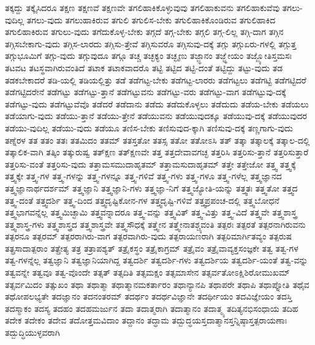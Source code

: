 {ತಕ್ಕದ್ದು
ತಕ್ಕೈಸಿದರೂ
ತಕ್ಷಣ
ತಕ್ಷಣವೆ
ತಕ್ಷಣವೇ
ತಗಲಿಹಾಕಿಕೊಳ್ಳುವುವು
ತಗಲಿಹಾಕುವನು
ತಗಲಿಹಾಕುವೆವು
ತಗಲು-ವುದಿಲ್ಲ
ತಗಲು-ವುದು
ತಗಲುಹಾಕಿರುವ
ತಗುಲಿ
ತಗುಲಿಸ-ಬೇಕು
ತಗುಲಿಹಾಕಿಕೊಂಡಿರುವ
ತಗುಲಿಹಾಕಿದ
ತಗುಲಿಹಾಕಿರುವ
ತಗುಲು-ವುದು
ತಗೆದುಕೊಳ್ಳ-ಬೇಕು
ತಗ್ಗದೆ
ತಗ್ಗ-ಬೇಕು
ತಗ್ಗಲಿ
ತಗ್ಗ-ಲಿಲ್ಲ
ತಗ್ಗಿ-ದಾಗ
ತಗ್ಗಿನ
ತಗ್ಗಿಸಬೇಕಾಗು-ವುದು
ತಗ್ಗಿಸ-ಲಾರದು
ತಗ್ಗಿಸು-ತ್ತೇವೆ
ತಗ್ಗಿಸುವರೊ
ತಗ್ಗಿಸುವು-ದಕ್ಕೆ
ತಗ್ಗು
ತಗ್ಗುಏರು-ಗಳಲ್ಲಿ
ತಗ್ಗುತ್ತ
ತಗ್ಗುಭೂಮಿಗೆ
ತಗ್ಗು-ವುದು
ತಗ್ಗುವುದೂ
ತಗ್ಗೂ
ತಚ್ಚ
ತಚ್ಛಕ್ಯಂ
ತಚ್ಛೃಣು
ತಜ್ಜ್ಞಾನಂ
ತಜ್ಜ್ಞೇಯಂ
ತಜ್ಜ್ಯೋತಿಸ್ತಮಸಃ
ತಟವಟ
ತಟಸ್ಥವಾಗಿರುವಂತಿದೆ
ತಟಾಕ
ತಟಾಕವಾದರೊ
ತಟ್ಟಿ
ತಟ್ಟಿದ
ತಟ್ಟಿ-ದಂತೆ
ತಟ್ಟಿದ್ದು
ತಟ್ಟು-ವುದು
ತಡ
ತಡಕಬೇಕಾದರೆ
ತಡಿ-ಯಲ್ಲಿ
ತಡಿಯಲ್ಲಿತ್ತು
ತಡೆ
ತಡೆಗಟ್ಟ-ಬೇಕು
ತಡೆಗಟ್ಟ-ಲಾರರು
ತಡೆಗಟ್ಟಲು
ತಡೆಗಟ್ಟಿ
ತಡೆಗಟ್ಟಿದರೆ
ತಡೆಗಟ್ಟಿದರೇನೆ
ತಡೆಗಟ್ಟು
ತಡೆಗಟ್ಟು-ತ್ತಾನೆ
ತಡೆಗಟ್ಟುವನು
ತಡೆಗಟ್ಟು-ವರು
ತಡೆಗಟ್ಟು-ವಾಗ
ತಡೆಗಟ್ಟುವು-ದಕ್ಕೆ
ತಡೆಗಟ್ಟು-ವುದು
ತಡೆಗಟ್ಟುವೆವೊ
ತಡೆದರೆ
ತಡೆದಾನು
ತಡೆದು
ತಡೆದುಕೊಳ್ಳಲು
ತಡೆದುದು
ತಡೆಯ-ಬೇಕು
ತಡೆಯಲು
ತಡೆಯಾಗು-ವುದು
ತಡೆಯು-ತ್ತಾನೆ
ತಡೆಯು-ತ್ತೇನೆ
ತಡೆಯುವನು
ತಡೆಯುವುದಕ್ಕೂ
ತಡೆಯುವು-ದಕ್ಕೆ
ತಡೆಯುವುದರ
ತಡೆಯು-ವುದಿಲ್ಲ
ತಡೆಯು-ವುದು
ತಡೆಯೂ
ತಣಿಸ-ಬೇಕು
ತಣಿಸುವುದ-ಕ್ಕಾಗಿ
ತಣಿಸುವು-ದಕ್ಕೆ
ತಣ್ಣಗಾಗು-ವುದು
ತಣ್ನೆರಳ
ತತ
ತತಂ
ತತಃ
ತತಮಿದಂ
ತತಮ್
ತತಸ್ತತೋ
ತತಸ್ಸ
ತತೋ
ತತೋಽಸಿ
ತತ್
ತತ್ಕಾ
ತತ್ಕಾಲಕ್ಕೆ
ತತ್ಕಾಲ-ದಲ್ಲಿ
ತತ್ಕಾಲಿಕ-ವಾಗಿ
ತತ್ಕಿಂ
ತತ್ಕುರುಷ್ವ
ತತ್ಕ್ಷಣ
ತತ್ಕ್ಷಣವೇ
ತತ್ತ
ತತ್ತದೇವಾವಗಚ್ಛ
ತತ್ತರಿಸಿ
ತತ್ತರಿಸು-ತ್ತಾನೆ
ತತ್ತರಿಸುತ್ತಾರೆ
ತತ್ತರಿಸು-ವಂತೆ
ತತ್ತರಿಸು-ವುದು
ತತ್ತಾಮಸಮುದಾಹೃತಮ್
ತತ್ತಾಮಸುದಾಹೃತಮ್
ತತ್ತೇ
ತತ್ತೇಜೋ
ತತ್ತ್ವ
ತತ್ತ್ವಕ್ಕೆ
ತತ್ತ್ವಕ್ಕೇ
ತತ್ತ್ವ-ಗಳ
ತತ್ತ್ವ-ಗಳನ್ನು
ತತ್ತ್ವ-ಗಳನ್ನೂ
ತತ್ತ್ವ-ಗಳಿವೆ
ತತ್ತ್ವ-ಗಳು
ತತ್ತ್ವ-ಗಳೂ
ತತ್ತ್ವ-ಗಳೆಲ್ಲ
ತತ್ತ್ವಜ್ಞಾನದ
ತತ್ತ್ವಜ್ಞಾನಾರ್ಥದರ್ಶಮ್
ತತ್ತ್ವಜ್ಞಾನಿ
ತತ್ತ್ವಜ್ಞಾನಿ-ಗಳು
ತತ್ತ್ವಜ್ಞಾ-ನಿಗೆ
ತತ್ತ್ವಜ್ಯೋತಿ-ಯನ್ನು
ತತ್ತ್ವತಃ
ತತ್ತ್ವತೋ
ತತ್ತ್ವದ
ತತ್ತ್ವ-ದಂತೆ
ತತ್ತ್ವದರ್ಶಿ
ತತ್ತ್ವ-ದಿಂದ
ತತ್ತ್ವದೃಷ್ಟಿಕೋನ-ಗಳ
ತತ್ತ್ವದೃಷ್ಟಿ-ಗಳಿವೆ
ತತ್ತ್ವಪ್ರಪಂಚ-ದಲ್ಲಿ
ತತ್ತ್ವಬೋಧನೆ
ತತ್ತ್ವಭಾಗವನ್ನೆಲ್ಲ
ತತ್ತ್ವಮಿಚ್ಛಾಮಿ
ತತ್ತ್ವವನ್ನಾದರೂ
ತತ್ತ್ವ-ವನ್ನು
ತತ್ತ್ವವಿತ್
ತತ್ತ್ವ-ವಿತ್ತು
ತತ್ತ್ವ-ವಿದೆ
ತತ್ತ್ವವೇ
ತತ್ತ್ವಶಾಸ್ತ್ರ
ತತ್ತ್ವಶಾಸ್ತ್ರ-ಗಳು
ತತ್ತ್ವಶಾಸ್ತ್ರದ
ತತ್ತ್ವಶಾಸ್ತ್ರವೇ
ತತ್ತ್ವಸೌಧಕ್ಕೆ
ತತ್ತ್ವೇನ
ತತ್ತ್ವೇನಾತಶ್ಚ್ಯವಂತಿ
ತತ್ಪರಃ
ತತ್ಪರತೆ
ತತ್ಪರನಾಗಿರುವನು
ತತ್ಪರನೂ
ತತ್ಪರಮ್
ತತ್ಪರರಾಗಿರು-ವಾಗ
ತತ್ಪರವಾಗಿರು-ವುದು
ತತ್ಪರಾಯಣರಾಗಿ
ತತ್ಪರಿಮಾರ್ಗಿತವ್ಯಂ
ತತ್ಪರುಷ
ತತ್ಪ್ರಸಾದಾತ್ಪರಾಂ
ತತ್ಪ್ರೇತ್ಯ
ತತ್ರ
ತತ್ರಾಪಶ್ಯತ್
ತತ್ರೈಕಸ್ಥಂ
ತತ್ರೈಕಾಗ್ರಮ್
ತತ್ರೈವಂ
ತತ್ರೈವಾವ್ಯಕ್ತಸಂಜ್ಞಕೇ
ತತ್ವ
ತತ್ವ-ಗಳ
ತತ್ವ-ಗಳನ್ನೆಲ್ಲ
ತತ್ವಜ್ಞಾನಿ
ತತ್ವಜ್ಞಾನಿಯಾಗಿದ್ದ
ತತ್ವದರ್ಶಿ
ತತ್ವದರ್ಶಿ-ಗಳು
ತತ್ವದರ್ಶಿಯ
ತತ್ವದರ್ಶಿ-ಯಂತೆ
ತತ್ವ-ವನ್ನು
ತತ್ವವನ್ನೇ
ತತ್ವವೂ
ತತ್ವ-ವೊಂದೇ
ತತ್ಸತ್
ತತ್ಸದಿತಿ
ತತ್ಸಮಕ್ಷಂ
ತತ್ಸಮಾಸೇನ
ತತ್ಸರ್ವತೋಽಕ್ಷಿಶಿರೋಮುಖಮ್
ತತ್ಸರ್ವಮಿದಂ
ತತ್ಸುಖಂ
ತಥಾ
ತಥಾತ್ಮಾ
ತಥಾತ್ಮಾನಮಕರ್ತಾರಂ
ತಥಾನ್ಯಾನಪಿ
ತಥಾಪರೇ
ತಥಾಪಿ
ತಥಾಪ್ನೋತಿ
ತಥೈವ
ತಥೋಪಲಭ್ಯತೇ
ತದಜ್ಞಾನಂ
ತದನಂತರಮ್
ತದರ್ಥಂ
ತದರ್ಥವಿಜ್ಞಾನೇ
ತದರ್ಥೀಯಂ
ತದವಿಜ್ಞೇಯಂ
ತದಸ್ತಿ
ತದಸ್ಮಾಕಂ
ತದಸ್ಯ
ತದಹಂ
ತದಹಮರ್ಜುನ
ತದಾ
ತದಾತ್ಮರಾಗಿ
ತದಾತ್ಮಾನಂ
ತದಾತ್ಮ್ಯ
ತದಿತ್ಯನಭಿಸಂಧಾಯ
ತದಿಹ
ತದೇಕ
ತದೇಕಂ
ತದೇವ
ತದೋತ್ತಮವಿದಾಂ
ತದ್ದಾನಂ
ತದ್ಧಾಮ
ತದ್ಬುದ್ಧಯಸ್ತದಾತ್ಮಾನಸ್ತನ್ನಿಷ್ಠಾಸ್ತತ್ಪರಾಯಣಾಃ
ತದ್ಬುದ್ಧಿಯುಳ್ಳವರಾಗಿ
}
